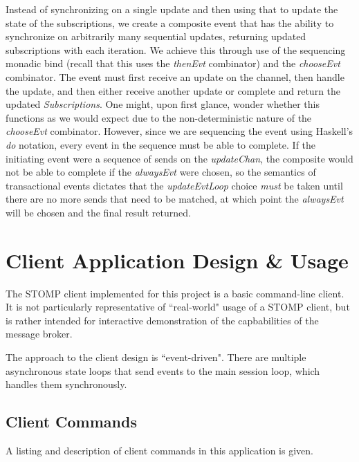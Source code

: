 \documentclass[conference, letterpaper]{IEEEtran}
\begin{document}
Instead of synchronizing on a single update and then using that to update the state of the subscriptions, we create a composite event that has the ability to synchronize on arbitrarily many sequential updates, returning updated subscriptions with each iteration. We achieve this through use of the sequencing monadic bind (recall that this uses the \textit{thenEvt} combinator) and the \textit{chooseEvt} combinator. The event must first receive an update on the channel, then handle the update, and then either receive another update or complete and return the updated \textit{Subscriptions}. One might, upon first glance, wonder whether this functions as we would expect due to the non-deterministic nature of the \textit{chooseEvt} combinator. However, since we are sequencing the event using Haskell's \textit{do} notation, every event in the sequence must be able to complete. If the initiating event were a sequence of sends on the \textit{updateChan}, the composite would not be able to complete if the \textit{alwaysEvt} were chosen, so the semantics of transactional events dictates that the \textit{updateEvtLoop} choice \textit{must} be taken until there are no more sends that need to be matched, at which point the \textit{alwaysEvt} will be chosen and the final result returned.

\section{Client Application Design \& Usage}

The STOMP client implemented for this project is a basic command-line client. It is not particularly representative of ``real-world" usage of a STOMP client, but is rather intended for interactive demonstration of the capbabilities of the message broker.

The approach to the client design is ``event-driven". There are multiple asynchronous state loops that send events to the main session loop, which handles them synchronously.

\subsection{Client Commands}

A listing and description of client commands in this application is given.
\end{document}
